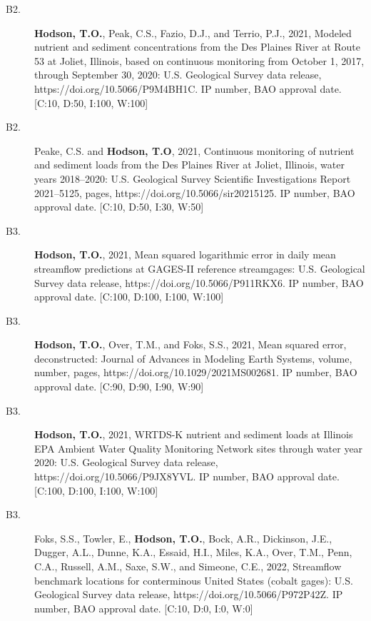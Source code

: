 \documentclass[12pt]{article}
\makeatletter
\def\namedlabel#1#2{\begingroup
	\def\@currentlabel{#2}%
	\label{#1}\endgroup
}
\makeatother
\begin{document}
\begin{description}
	\item[B2.\namedlabel{joliet_dr}{B2}]
    \textbf{Hodson, T.O.}, Peak, C.S., Fazio, D.J., and Terrio, P.J.,
    2021, Modeled nutrient and sediment concentrations from the Des Plaines River at Route 53 at Joliet, Illinois, based on continuous monitoring from October 1, 2017, through September 30, 2020:
    U.S. Geological Survey data release, https://doi.org/10.5066/P9M4BH1C.
    IP number, BAO approval date. [C:10, D:50, I:100, W:100]
    
	\item[B2.\namedlabel{joliet}{B2}]
    Peake, C.S. and \textbf{Hodson, T.O},
    2021, Continuous monitoring of nutrient and sediment loads from the Des Plaines River at Joliet, Illinois, water years 2018--2020:
    U.S. Geological Survey Scientific Investigations Report 2021--5125, pages, 
    https://doi.org/10.5066/sir20215125.
    IP number, BAO approval date. [C:10, D:50, I:30, W:50]
    
	\item[B3.\namedlabel{dscore_dr}{B3}]
    \textbf{Hodson, T.O.}, 2021, Mean squared logarithmic error in daily mean streamflow predictions at GAGES-II reference streamgages: U.S. Geological Survey data release, https://doi.org/10.5066/P911RKX6.
    IP number, BAO approval date. [C:100, D:100, I:100, W:100]
    
	\item[B3.\namedlabel{dscore}{B3}]
    \textbf{Hodson, T.O.}, Over, T.M., and Foks, S.S., 2021, Mean squared error, deconstructed:
    Journal of Advances in Modeling Earth Systems, volume, number, pages, https://doi.org/10.1029/2021MS002681.
    IP number, BAO approval date. [C:90, D:90, I:90, W:90]
    
 	\item[B3.\namedlabel{ambient2021}{B3}] \textbf{Hodson, T.O.}, 2021, WRTDS-K nutrient and sediment loads at Illinois EPA Ambient Water Quality Monitoring Network sites through water year 2020:
    U.S. Geological Survey data release, https://doi.org/10.5066/P9JX8YVL.
    IP number, BAO approval date. [C:100, D:100, I:100, W:100]
    
    \item[B3.\namedlabel{benchmark_2021}{B3}]
    Foks, S.S., Towler, E., \textbf{Hodson, T.O.}, Bock, A.R., Dickinson, J.E., Dugger, A.L., Dunne, K.A., Essaid, H.I., Miles, K.A., Over, T.M., Penn, C.A., Russell, A.M., Saxe, S.W., and Simeone, C.E.,
    2022, Streamflow benchmark locations for conterminous United States (cobalt gages):
    U.S. Geological Survey data release, https://doi.org/10.5066/P972P42Z.
    IP number, BAO approval date. [C:10, D:0, I:0, W:0]
    

\end{description}
\end{document}
